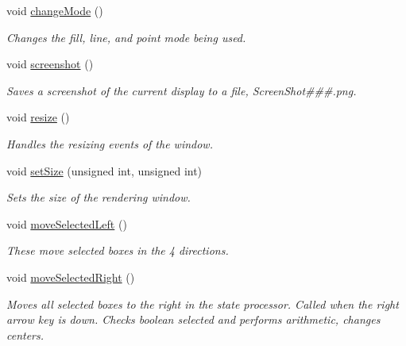 \begin{DoxyCompactItemize}
\mbox{\label{class_graphics_engine_a7f549d3ad00c34e61d067fdd2a911034}} 
void \hyperlink{class_graphics_engine_a7f549d3ad00c34e61d067fdd2a911034}{change\+Mode} ()
\begin{DoxyCompactList}\small\item\em Changes the fill, line, and point mode being used. \end{DoxyCompactList}\item 
\mbox{\label{class_graphics_engine_a7b12982b41cbdb107f48863798be2ed7}} 
void \hyperlink{class_graphics_engine_a7b12982b41cbdb107f48863798be2ed7}{screenshot} ()
\begin{DoxyCompactList}\small\item\em Saves a screenshot of the current display to a file, Screen\+Shot\#\#\#.png. \end{DoxyCompactList}\item 
\mbox{\label{class_graphics_engine_a6a38e40ee4227a8b53dddf07f92323ee}} 
void \hyperlink{class_graphics_engine_a6a38e40ee4227a8b53dddf07f92323ee}{resize} ()
\begin{DoxyCompactList}\small\item\em Handles the resizing events of the window. \end{DoxyCompactList}\item 
void \hyperlink{class_graphics_engine_aac1a9cc3d195ed1f28018dffd80dae41}{set\+Size} (unsigned int, unsigned int)
\begin{DoxyCompactList}\small\item\em Sets the size of the rendering window. \end{DoxyCompactList}\item 
void \hyperlink{class_graphics_engine_a7f09e50b78a6957ce0bcc2442ba49e06}{move\+Selected\+Left} ()
\begin{DoxyCompactList}\small\item\em These move selected boxes in the 4 directions. \end{DoxyCompactList}\item 
\mbox{\label{class_graphics_engine_a3de0f5b6a7ee163e3cd81cd70b6b2aa2}} 
void \hyperlink{class_graphics_engine_a3de0f5b6a7ee163e3cd81cd70b6b2aa2}{move\+Selected\+Right} ()
\begin{DoxyCompactList}\small\item\em Moves all selected boxes to the right in the state processor. Called when the right arrow key is down. Checks boolean selected and performs arithmetic, changes centers. \end{DoxyCompactList}\item 

\end{DoxyCompactItemize}
